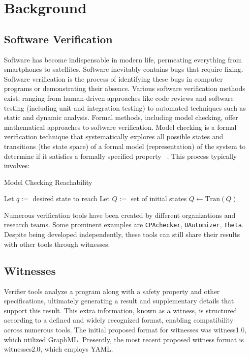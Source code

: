 \chapter{Background}

\section{Software Verification}
Software has become indispensable in modern life, permeating everything from smartphones to 
satellites. Software inevitably contains bugs that require fixing. Software verification is 
the process of identifying these bugs in computer programs or demonstrating their absence. 
Various software verification methods exist, ranging from human-driven approaches like code 
reviews and software testing (including unit and integration testing) to automated techniques 
such as static and dynamic analysis. Formal methods, including model checking, offer mathematical 
approaches to software verification. Model checking is a formal verification technique that 
systematically explores all possible states and transitions (the state space) of a formal model 
(representation) of the system to determine if it satisfies a formally specified property~\cite{HandbookMC} .
This process typically involves:

\begin{algorithm}
\caption{Model Checking Reachability}
\begin{algorithmic}
\State Let $q :=$ desired state to reach
\State Let $Q :=$ set of initial states
  \State $Q \gets \text{Tran}(Q)$
\EndWhile
\end{algorithmic}
\end{algorithm}


Numerous verification tools have been created by different organizations and research teams. 
Some prominent examples are \texttt{CPAchecker}, \texttt{UAutomizer}, \texttt{Theta}.
Despite being developed independently, these tools can still share their results with other tools
through witnesses.

\section{Witnesses}
Verifier tools analyze a program along with a safety property and other specifications, ultimately
generating a result and supplementary details that support this result. This extra information, 
known as a witness, is structured according to a defined and widely recognized format, enabling 
compatibility across numerous tools. The initial proposed format for witnesses was witness1.0, which 
utilized GraphML. Presently, the most recent proposed witness format is witnesses2.0, which employs YAML.

